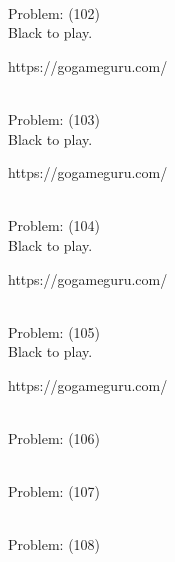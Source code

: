 \documentclass[11pt]{article}
\begin{document}
\begin{minipage}[t]{0.5\textwidth}
  {\centering
  
\\
Problem: (102)\\
Black to play.

https://gogameguru.com/\\
  }
\end{minipage}
\begin{minipage}[t]{0.5\textwidth}
  {\centering
  
\\
Problem: (103)\\
Black to play.

https://gogameguru.com/\\
  }
\end{minipage}
\begin{minipage}[t]{0.5\textwidth}
  {\centering
  
\\
Problem: (104)\\
Black to play.

https://gogameguru.com/\\
  }
\end{minipage}
\begin{minipage}[t]{0.5\textwidth}
  {\centering
  
\\
Problem: (105)\\
Black to play.

https://gogameguru.com/\\
  }
\end{minipage}
\begin{minipage}[t]{0.5\textwidth}
  {\centering
  
\\
Problem: (106)\\
  }
\end{minipage}
\begin{minipage}[t]{0.5\textwidth}
  {\centering
  
\\
Problem: (107)\\
  }
\end{minipage}
\begin{minipage}[t]{0.5\textwidth}
  {\centering
  
\\
Problem: (108)\\
  }
\end{minipage}
\end{document}
